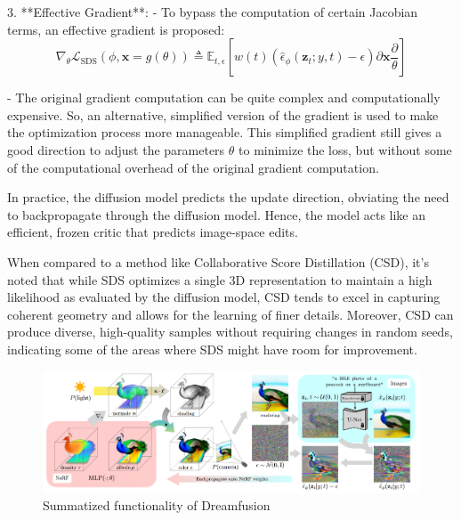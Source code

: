 3. **Effective Gradient**:
   - To bypass the computation of certain Jacobian terms, an effective gradient is proposed:
     \[ \nabla_{\theta}\mathcal{L}_{\text{SDS}}(\phi,\mathbf{x}=g(\theta))\triangleq\mathbb{E}_{t,\epsilon}\left[w(t)\left(\hat{\epsilon}_{\phi}({\mathbf{z}}_{t};y,t)-\epsilon\right){\partial\mathbf{x}\frac\partial\theta}\right] \]

    - The original gradient computation can be quite complex and computationally expensive. So, an alternative, simplified version of the gradient is used to make the optimization process more manageable. This simplified gradient still gives a good direction to adjust the parameters \( \theta \) to minimize the loss, but without some of the computational overhead of the original gradient computation.


In practice, the diffusion model predicts the update direction, obviating the need to backpropagate through the diffusion model. Hence, the model acts like an efficient, frozen critic that predicts image-space edits.

When compared to a method like Collaborative Score Distillation (CSD), it's noted that while SDS optimizes a single 3D representation to maintain a high likelihood as evaluated by the diffusion model, CSD tends to excel in capturing coherent geometry and allows for the learning of finer details. Moreover, CSD can produce diverse, high-quality samples without requiring changes in random seeds, indicating some of the areas where SDS might have room for improvement.

\begin{figure}[ht]
  \centering
    \includegraphics[width=1\columnwidth]{figures/Dreamfusion.png}
    \caption{Summatized functionality of Dreamfusion}\label{fig:figureDreamfusion}
  \end{figure}